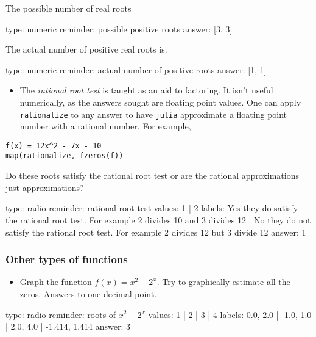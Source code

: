 \documentclass[12pt]{article}
\begin{document}
The possible number of real roots

\begin{answer}
    type: numeric
    reminder: possible positive roots
    answer: [3, 3]

\end{answer}

The actual number of positive real roots is:

\begin{answer}
    type: numeric
    reminder: actual number of positive roots
    answer: [1, 1]

\end{answer}

\begin{itemize}
\itemsep1pt\parskip0pt
\item
  The \emph{rational root test} is taught as an aid to factoring. It
  isn't useful numerically, as the answers sought are floating point
  values. One can apply \texttt{rationalize} to any answer to have
  \texttt{julia} approximate a floating point number with a rational
  number. For example,
\end{itemize}



\begin{verbatim}
f(x) = 12x^2 - 7x - 10
map(rationalize, fzeros(f))
\end{verbatim}
Do these roots satisfy the rational root test or are the rational
approximations just approximations?

\begin{answer}
type: radio
reminder: rational root test
values: 1 | 2
labels: Yes they do satisfy the rational root test. For example 2 divides 10 and 3 divides 12 | No they do not satisfy the rational root test. For example 2 divides 12 but 3  divide 12
answer: 1
\end{answer}

\subsubsection{Other types of functions}

\begin{itemize}
\itemsep1pt\parskip0pt
\item
  Graph the function $f(x)= x^2 - 2^x$. Try to graphically estimate all
  the zeros. Answers to one decimal point.
\end{itemize}

\begin{answer}
type: radio
reminder: roots of \( x^2 - 2^x \)
values: 1 | 2 | 3 | 4
labels: 0.0, 2.0 | -1.0, 1.0 | 2.0, 4.0 | -1.414, 1.414
answer: 3
\end{answer}
\end{document}
